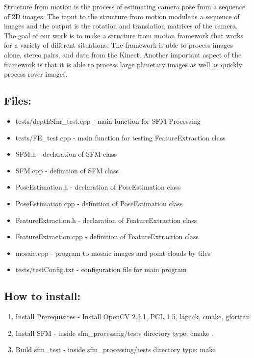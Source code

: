 Structure from motion is the process of estimating camera pose from a sequence of 2D images. The input to the structure from motion module is a sequence of images and the output is the rotation and translation matrices of the camera. The goal of our work is to make a structure from motion framework that works for a variety of different situations. The framework is able to process images alone, stereo pairs, and data from the Kinect. Another important aspect of the framework is that it is able to process large planetary images as well as quickly process rover images.

\subsection{Files:}
\begin{itemize}
	\item{tests/depthSfm\_test.cpp} - main function for SFM Processing
	\item{tests/FE\_test.cpp} - main function for testing FeatureExtraction class
	\item{SFM.h} - declaration of SFM class
	\item{SFM.cpp} - definition of SFM class
	\item{PoseEstimation.h} - declaration of PoseEstimation class
	\item{PoseEstimation.cpp} - definition of PoseEstimation class
	\item{FeatureExtraction.h} - declaration of FeatureExtraction class
	\item{FeatureExtraction.cpp} - definition of FeatureExtraction class
   \item{mosaic.cpp} - program to mosaic images and point clouds by tiles
	\item{tests/testConfig.txt} - configuration file for main program
\end{itemize}


\subsection{How to install:}
\begin{enumerate}
	\item{Install Prerequisites} - Install OpenCV 2.3.1, PCL 1.5, lapack, cmake, gfortran
	\item{Install SFM} - inside sfm\_processing/tests directory type: cmake .
	\item{Build sfm\_test} - inside sfm\_processing/tests directory type: make
\end{enumerate}

